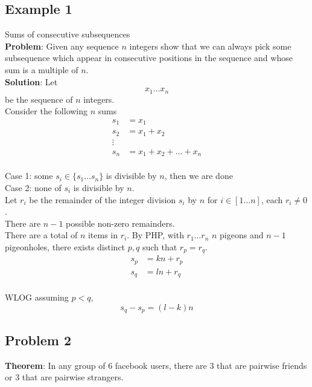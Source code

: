 \subsection{Example 1}

Sums of consecutive subsequences \\

\textbf{Problem}: Given any sequence $n$ integers show that we can always pick some subsequence which appear in consecutive positions in the sequence and whose sum is a multiple of $n$. \\

\textbf{Solution}: Let 
\[
  x_1 \hdots x_n
\] 
be the sequence of $n$ integers. \\

Consider the following $n$ sums
\begin{align*}
   s_1 &= x_1 \\
   s_2 &= x_1  + x_2\\
   \vdots & \\
   s_n &= x_1  + x_2 + \hdots + x_n\\
\end{align*}

Case 1: some $s_i \in \{ s_1 \hdots s_n \} $ is divisible by $n$, then we are done \\

Case 2: none of $s_i$ is divisible by $n$. \\

Let $r_i$ be the remainder of the integer division $s_i$ by $n$ for $i \in [1 \hdots n]$, each  $r_i \neq 0$. \\

There are  $n-1$ possible non-zero remainders. \\

There are a total of $n$ items in $r_i$. By PHP, with  $r_1 \hdots r_n$ $n$ pigeons and $n-1$ pigeonholes, there exists distinct $p, q$ such that $r_p = r_q$. \\

 \begin{align*}
    s_p &= kn + r_p \\
    s_q &= ln + r_q \\
\end{align*}

WLOG assuming $p < q$,  
\[
  s_q - s_p = (l - k) n
\] 

\subsection{Problem 2}
\textbf{Theorem}: In any group of 6 facebook users, there are 3 that are pairwise friends or $3$ that are pairwise strangers. \\

